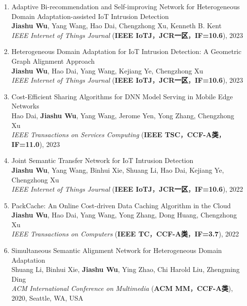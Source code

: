 \documentclass[UTF8,letterpaper,11pt]{article}
\begin{document}
\begin{enumerate}
  \setlength\itemsep{1pt}
  \item Adaptive Bi-recommendation and Self-improving Network for Heterogeneous Domain Adaptation-assisted IoT Intrusion Detection\\
  \textbf{Jiashu Wu}, Yang Wang\textsuperscript{\Letter}, Hao Dai, Chengzhong Xu, Kenneth B. Kent\\
  \textit{IEEE Internet of Things Journal} (\textbf{IEEE IoTJ}，\textbf{JCR一区}，\textbf{IF=10.6}), 2023

  \item Heterogeneous Domain Adaptation for IoT Intrusion Detection: A Geometric Graph Alignment Approach\\
  \textbf{Jiashu Wu}, Hao Dai, Yang Wang\textsuperscript{\Letter}, Kejiang Ye, Chengzhong Xu\\
  \textit{IEEE Internet of Things Journal} (\textbf{IEEE IoTJ}，\textbf{JCR一区}，\textbf{IF=10.6}), 2023

  \item Cost-Efficient Sharing Algorithms for DNN Model Serving in Mobile Edge Networks\\
  Hao Dai, \textbf{Jiashu Wu}, Yang Wang\textsuperscript{\Letter}, Jerome Yen, Yong Zhang, Chengzhong Xu\\
  \textit{IEEE Transactions on Services Computing} (\textbf{IEEE TSC}，\textbf{CCF-A类}，\textbf{IF=11.0}), 2023

  \item Joint Semantic Transfer Network for IoT Intrusion Detection\\
  \textbf{Jiashu Wu}, Yang Wang\textsuperscript{\Letter}, Binhui Xie, Shuang Li, Hao Dai, Kejiang Ye, Chengzhong Xu\\
  \textit{IEEE Internet of Things Journal} (\textbf{IEEE IoTJ}，\textbf{JCR一区}，\textbf{IF=10.6}), 2022

  \item PackCache: An Online Cost-driven Data Caching Algorithm in the Cloud\\
  \textbf{Jiashu Wu}, Hao Dai, Yang Wang\textsuperscript{\Letter}, Yong Zhang, Dong Huang, Chengzhong Xu\\
  \textit{IEEE Transactions on Computers} (\textbf{IEEE TC}，\textbf{CCF-A类}，\textbf{IF=3.7}), 2022

  \item Simultaneous Semantic Alignment Network for Heterogeneous Domain Adaptation\\
  Shuang Li, Binhui Xie, \textbf{Jiashu Wu}, Ying Zhao, Chi Harold Liu\textsuperscript{\Letter}, Zhengming Ding\\
  \textit{ACM International Conference on Multimedia} (\textbf{ACM MM}，\textbf{CCF-A类}), 2020, Seattle, WA, USA


\end{enumerate}
\end{document}
